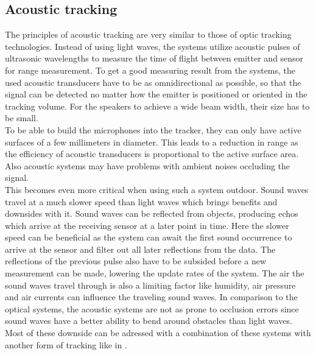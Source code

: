 \subsection{Acoustic tracking}
The principles of acoustic tracking are very similar to those of optic tracking technologies. Instead of using light waves, the systems utilize acoustic pulses of ultrasonic wavelengths to measure the time of flight between emitter and sensor for range measurement. To get a good measuring result from the systems, the used acoustic transducers have to be as omnidirectional as possible, so that the signal can be detected no matter how the emitter is positioned or oriented in the tracking volume. For the speakers to achieve a wide beam width, their size has to be small.\\
To be able to build the microphones into the tracker, they can only have active surfaces of a few millimeters in diameter. This leads to a reduction in range as the efficiency of acoustic transducers is proportional to the active surface area. Also acoustic systems may have problems with ambient noises occluding the signal. \\This becomes even more critical when using such a system outdoor. Sound waves travel at a much slower speed than light waves which brings benefits and downsides with it. Sound waves can be reflected from objects, producing echos which arrive at the receiving sensor at a later point in time. Here the slower speed can be beneficial as the system can await the first sound occurrence to arrive at the sensor and filter out all later reflections from the data. The reflections of the previous pulse also have to be subsided before a new measurement can be made, lowering the update rates of the system. The air the sound waves travel through is also a limiting factor like humidity, air pressure and air currents can influence the traveling sound waves. In comparison to the optical systems, the acoustic systems are not as prone to occlusion errors since sound waves have a better ability to bend around obstacles than light waves.
Most of these downside can be adressed with a combination of these systems with another form of tracking like in \cite{Foxlin.1998}.
